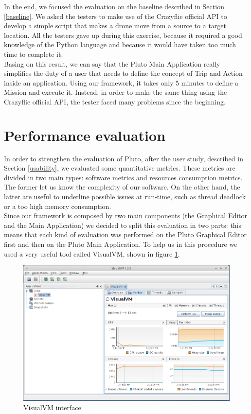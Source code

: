 In the end, we focused the evaluation on the baseline described in Section \ref{baseline}.
We asked the testers to make use of the Crazyflie official API to develop a simple script that makes a drone move from a source to a target location.
All the testers gave up during this exercise, because it required a good knowledge of the Python language and because it would have taken too much time to complete it.
\\
Basing on this result, we can say that the Pluto Main Application really simplifies the duty of a user that needs to define the concept of Trip and Action inside an application.
Using our framework, it takes only 5 minutes to define a Mission and execute it.
Instead, in order to make the same thing using the Crazyflie official API, the tester faced many problems since the beginning.
\\

\newpage

\section{Performance evaluation}\label{performance}

In order to strengthen the evaluation of Pluto, after the user study, described in Section \ref{usability}, we evaluated some quantitative metrics. These metrics are divided in two main types: software metrics and resources consumption metrics. The former let us know the complexity of our software.
On the other hand, the latter are useful to underline possible issues at run-time, such as thread deadlock or a too high memory consumption.
\\

Since our framework is composed by two main components (the Graphical Editor and the Main Application) we decided to split this evaluation in two parts: this means that each kind of evaluation was performed on the Pluto Graphical Editor first and then on the Pluto Main Application.
To help us in this procedure we used a very useful tool called VisualVM, shown in figure \ref{fig:visualVM}. 

\begin{figure}[H]
  \centering
  \includegraphics[width=\linewidth]{pictures/visualVM.png}
  \caption{VisualVM interface}
  \label{fig:visualVM}
\end{figure}

